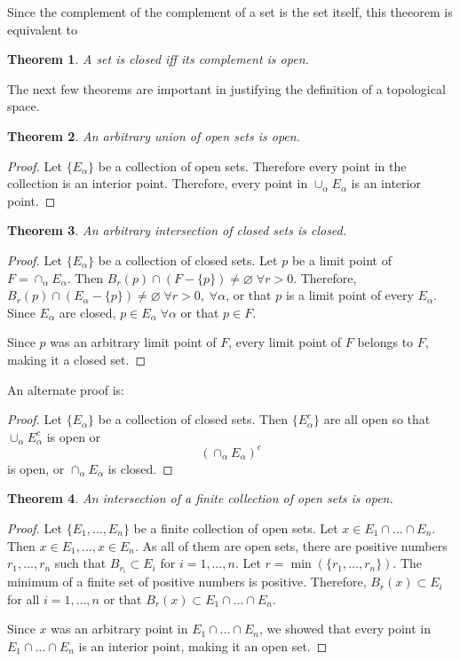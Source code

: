 \documentclass{article}
\theoremstyle{plain}
\newtheorem{thm}{Theorem}
\numberwithin{thm}{section}
\theoremstyle{plain}
\numberwithin{prop}{section}
\theoremstyle{definition}
\numberwithin{defn}{section}
\theoremstyle{remark}
\numberwithin{equation}{section}
\begin{document}
Since the complement of the complement of a set is the set itself, this theeorem
is equivalent to
\begin{thm}\label{s1t2}
A set is closed iff its complement is open.
\end{thm}

The next few theorems are important in justifying the definition of a 
topological space.
\begin{thm}\label{s1t3}
An arbitrary union of open sets is open.
\end{thm}
\begin{proof}
Let $\{E_\alpha\}$ be a collection of open sets. Therefore every point in the
collection is an interior point. Therefore, every point in $\cup_\alpha 
E_\alpha$ is an interior point.
\end{proof}

\begin{thm}\label{s1t4}
An arbitrary intersection of closed sets is closed.
\end{thm}
\begin{proof}
Let $\{E_\alpha\}$ be a collection of closed sets. Let $p$ be a limit point of
$F = \cap_\alpha E_\alpha$. Then $B_r(p) \cap (F - \{p\}) \ne \varnothing \;
\forall r > 0$. Therefore, $B_r(p) \cap (E_\alpha - \{p\}) \ne \varnothing \;
\forall r > 0, \;\forall \alpha$, or that $p$ is a limit point of every 
$E_\alpha$. Since $E_\alpha$ are closed, $p \in E_\alpha\;\forall \alpha$ or
that $p \in F$.

Since $p$ was an arbitrary limit point of $F$, every limit point of $F$ belongs
to $F$, making it a closed set.
\end{proof}

An alternate proof is:
\begin{proof}
Let $\{E_\alpha\}$ be a collection of closed sets. Then $\{E_\alpha^c\}$ are
all open so that $\cup_\alpha E_\alpha^c$ is open or
\[
\left(\cap_\alpha E_\alpha\right)^c
\]
is open, or $\cap_\alpha E_\alpha$ is closed.
\end{proof}

\begin{thm}\label{s1t5}
An intersection of a finite collection of open sets is open.
\end{thm}
\begin{proof}
Let $\{E_1, \ldots, E_n\}$ be a finite collection of open sets. Let $x \in 
E_1 \cap \ldots \cap E_n$. Then $x \in E_1, \ldots, x \in E_n$. As all of them
are open sets, there are positive numbers $r_1, \ldots, r_n$ such that 
$B_{r_i} \subset E_i$ for $i = 1, \ldots, n$. Let $r = \min(\{r_1, \ldots, 
r_n\})$. The minimum of a finite set of positive numbers is positive. Therefore,
$B_r(x) \subset E_i$ for all $i = 1, \ldots, n$ or that $B_r(x) \subset E_1
\cap \ldots \cap E_n$. 

Since $x$ was an arbitrary point in $E_1 \cap \ldots \cap E_n$, we showed that
every point in $E_1 \cap \ldots \cap E_n$ is an interior point, making it an
open set.
\end{proof}
\end{document}
